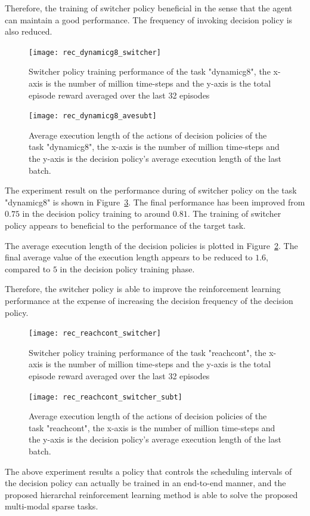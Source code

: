 Therefore, the training of switcher policy beneficial in the sense that the agent can maintain a good performance. The frequency of invoking decision policy is also reduced.
\begin{figure}[!htbp]
	\centering
	\texttt{[image: rec\_dynamicg8\_switcher]}
	\caption{Switcher policy training performance of the task "dynamicg8", the x-axis is the number of million time-steps and the y-axis is the total episode reward averaged over the last 32 episodes}
	\label{fig:rec_dynamicg8_switcher}
\end{figure}

\begin{figure}[!htbp]
	\centering
	\texttt{[image: rec\_dynamicg8\_avesubt]}
	\caption{Average execution length of the actions of decision policies of the task "dynamicg8", the x-axis is the number of million time-steps and the y-axis is the decision policy's average execution length of the last batch.}
	\label{fig:rec_dynamicg8_avesubt}
\end{figure}

The experiment result on the performance during of switcher policy on the task "dynamicg8" is shown in Figure~\ref{fig:rec_reachcont_switcher}. The final performance has been improved from $0.75$ in the decision policy training to around $0.81$. The training of switcher policy appears to beneficial to the performance of the target task.

The average execution length of the decision policies is plotted in Figure~\ref{fig:rec_dynamicg8_avesubt}. The final average value of the execution length appears to be reduced to $1.6$, compared to $5$ in the decision policy training phase.

Therefore, the switcher policy is able to improve the reinforcement learning performance at the expense of increasing the decision frequency of the decision policy.

\begin{figure}[!htbp]
	\centering
	\texttt{[image: rec\_reachcont\_switcher]}
	\caption{Switcher policy training performance of the task "reachcont", the x-axis is the number of million time-steps and the y-axis is the total episode reward averaged over the last 32 episodes}
	\label{fig:rec_reachcont_switcher}
\end{figure}

\begin{figure}[!htbp]
	\centering
	\texttt{[image: rec\_reachcont\_switcher\_subt]}
	\caption{Average execution length of the actions of decision policies of the task "reachcont", the x-axis is the number of million time-steps and the y-axis is the decision policy's average execution length of the last batch.}
	\label{fig:rec_reachcont_switcher_subt}
\end{figure}

The above experiment results a policy that controls the scheduling intervals of the decision policy can actually be trained in an end-to-end manner, and the proposed hierarchal reinforcement learning method is able to solve the proposed multi-modal sparse tasks.